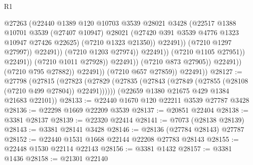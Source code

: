 \begin{lexlean}{R1}
\begin{coremodule}
                                                @27263
                                                (@22440
                                                  @1389
                                                  @120
                                                  @10703
                                                  @3539
                                                  @28021
                                                  @3428
                                                  (@22517
                                                    @1388
                                                    @10701
                                                    @3539
                                                    (@27407 @10947)
                                                    @28021
                                                    (@27420
                                                      @391
                                                      @3539
                                                      @4776
                                                      @1323
                                                      @10947
                                                      @27426
                                                      @22625)
                                                    (@7210 @1323 @21350))
                                                  @22491))
                                              (@7210 @1297 @27997))
                                            @22491))
                                        (@7210 @1203 @27974))
                                      @22491))
                                  (@7210 @1105 @27951))
                                @22491))
                            (@7210 @1011 @27928))
                          @22491))
                      (@7210 @873 @27905))
                    @22491))
                (@7210 @795 @27882))
              @22491))
          (@7210 @657 @27859))
        @22491))
@28127 := @27798
    (@27815
      (@27823 (@27829 (@27835 (@27843 (@27849 (@27855 (@28108 (@7210 @499 @27804)) @22491))))))
      (@22659 @1380 @21675 @429 @1384 @21683 @22101))
@28133 := @22440 @1670 @120 @22211 @3539 @27787 @3428
@28136 := @22298 @1669 @22209 @3539
@28137 := @20851 @22404
@28138 := @3381 @28137
@28139 := @22320 @22414
@28141 := @7073 (@28138 @28139)
@28143 := @3381 @28141 @3428
@28146 := @28136 (@27784 @28143) @27787
@28152 := @22440 @1531 @1668 @22144 @22208 @27783 @28143
@28155 := @22448 @1530 @22114 @22143
@28156 := @3381 @1432
@28157 := @3381 @1436
@28158 := @21301 @22140

\end{coremodule}
\end{lexlean}
